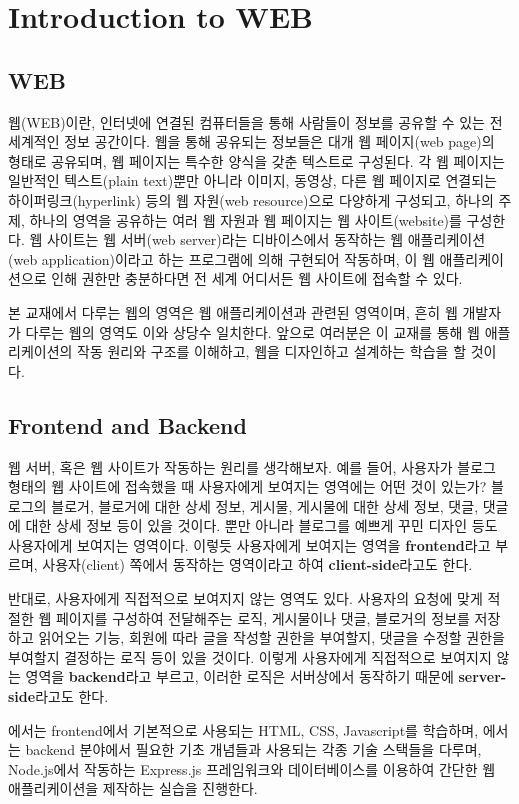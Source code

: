 \section{Introduction to WEB}\label{sect:introduction-to-web}

\subsection*{WEB}

웹(WEB)이란, 인터넷에 연결된 컴퓨터들을 통해 사람들이 정보를 공유할 수 있는 전 세계적인 정보 공간이다. 웹을 통해 공유되는 정보들은 대개 웹 페이지(web page)의 형태로 공유되며, 웹 페이지는 특수한 양식을 갖춘 텍스트로 구성된다. 각 웹 페이지는 일반적인 텍스트(plain text)뿐만 아니라 이미지, 동영상, 다른 웹 페이지로 연결되는 하이퍼링크(hyperlink) 등의 웹 자원(web resource)으로 다양하게 구성되고, 하나의 주제, 하나의 영역을 공유하는 여러 웹 자원과 웹 페이지는 웹 사이트(website)를 구성한다. 웹 사이트는 웹 서버(web server)라는 디바이스에서 동작하는 웹 애플리케이션(web application)이라고 하는 프로그램에 의해 구현되어 작동하며, 이 웹 애플리케이션으로 인해 권한만 충분하다면 전 세계 어디서든 웹 사이트에 접속할 수 있다.

본 교재에서 다루는 웹의 영역은 웹 애플리케이션과 관련된 영역이며, 흔히 웹 개발자가 다루는 웹의 영역도 이와 상당수 일치한다. 앞으로 여러분은 이 교재를 통해 웹 애플리케이션의 작동 원리와 구조를 이해하고, 웹을 디자인하고 설계하는 학습을 할 것이다.

\subsection*{Frontend and Backend}

웹 서버, 혹은 웹 사이트가 작동하는 원리를 생각해보자. 예를 들어, 사용자가 블로그 형태의 웹 사이트에 접속했을 때 사용자에게 보여지는 영역에는 어떤 것이 있는가? 블로그의 블로거, 블로거에 대한 상세 정보, 게시물, 게시물에 대한 상세 정보, 댓글, 댓글에 대한 상세 정보 등이 있을 것이다. 뿐만 아니라 블로그를 예쁘게 꾸민 디자인 등도 사용자에게 보여지는 영역이다. 이렇듯 사용자에게 보여지는 영역을 \textbf{frontend}라고 부르며, 사용자(client) 쪽에서 동작하는 영역이라고 하여 \textbf{client-side}라고도 한다.

반대로, 사용자에게 직접적으로 보여지지 않는 영역도 있다. 사용자의 요청에 맞게 적절한 웹 페이지를 구성하여 전달해주는 로직, 게시물이나 댓글, 블로거의 정보를 저장하고 읽어오는 기능, 회원에 따라 글을 작성할 권한을 부여할지, 댓글을 수정할 권한을 부여할지 결정하는 로직 등이 있을 것이다. 이렇게 사용자에게 직접적으로 보여지지 않는 영역을 \textbf{backend}라고 부르고, 이러한 로직은 서버상에서 동작하기 때문에 \textbf{server-side}라고도 한다.


에서는 frontend에서 기본적으로 사용되는 HTML, CSS, Javascript를 학습하며, 에서는 backend 분야에서 필요한 기초 개념들과 사용되는 각종 기술 스택들을 다루며, Node.js에서 작동하는 Express.js 프레임워크와 데이터베이스를 이용하여 간단한 웹 애플리케이션을 제작하는 실습을 진행한다.
